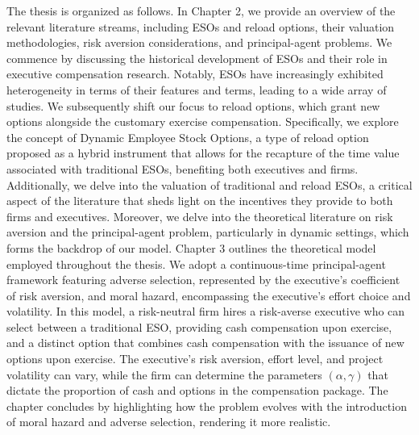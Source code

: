 The thesis is organized as follows.
In Chapter 2, we provide an overview of the relevant literature streams, including ESOs and reload options, their valuation methodologies, risk aversion considerations, and principal-agent problems. We commence by discussing the historical development of ESOs and their role in executive compensation research. Notably, ESOs have increasingly exhibited heterogeneity in terms of their features and terms, leading to a wide array of studies. We subsequently shift our focus to reload options, which grant new options alongside the customary exercise compensation. Specifically, we explore the concept of Dynamic Employee Stock Options, a type of reload option proposed as a hybrid instrument that allows for the recapture of the time value associated with traditional ESOs, benefiting both executives and firms. Additionally, we delve into the valuation of traditional and reload ESOs, a critical aspect of the literature that sheds light on the incentives they provide to both firms and executives. Moreover, we delve into the theoretical literature on risk aversion and the principal-agent problem, particularly in dynamic settings, which forms the backdrop of our model.
Chapter 3 outlines the theoretical model employed throughout the thesis. We adopt a continuous-time principal-agent framework featuring adverse selection, represented by the executive's coefficient of risk aversion, and moral hazard, encompassing the executive's effort choice and volatility. In this model, a risk-neutral firm hires a risk-averse executive who can select between a traditional ESO, providing cash compensation upon exercise, and a distinct option that combines cash compensation with the issuance of new options upon exercise. The executive's risk aversion, effort level, and project volatility can vary, while the firm can determine the parameters $(\alpha, \gamma)$ that dictate the proportion of cash and options in the compensation package. The chapter concludes by highlighting how the problem evolves with the introduction of moral hazard and adverse selection, rendering it more realistic.
